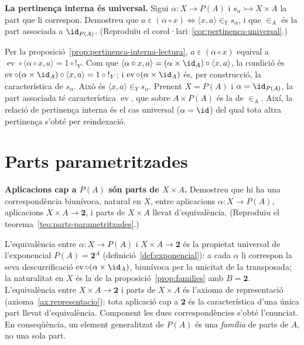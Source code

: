 \begin{exercici}
\textbf{La pertinença interna és universal.} Sigui \(\alpha\colon X\to P(A)\) i \(s_\alpha\rightarrowtail X\times A\) la part que li correspon. Demostreu que \(a\mathrel{\varepsilon}(\alpha\circ x)\iff\langle x,a\rangle\in_Y s_\alpha\), i que \(\in_A\) és la part associada a \(\id_{P(A)}\). (Reproduïu el corol·lari~\ref{cor:pertinenca-universal}.)
\end{exercici}
\begin{solucio}
Per la proposició~\ref{prop:pertinenca-interna-lectura}, \(a\mathrel{\varepsilon}(\alpha\circ x)\) equival a \(\operatorname{ev}\circ\langle\alpha\circ x,a\rangle=1\circ{!}_Y\). Com que \(\langle\alpha\circ x,a\rangle=(\alpha\times\id_A)\circ\langle x,a\rangle\), la condició és \(\operatorname{ev}\circ(\alpha\times\id_A)\circ\langle x,a\rangle=1\circ{!}_Y\); i \(\operatorname{ev}\circ(\alpha\times\id_A)\) és, per construcció, la característica de \(s_\alpha\). Això és \(\langle x,a\rangle\in_Y s_\alpha\). Prenent \(X=P(A)\) i \(\alpha=\id_{P(A)}\), la part associada té característica \(\operatorname{ev}\), que sobre \(A\times P(A)\) és la de \(\in_A\). Així, la relació de pertinença interna és el cas universal (\(\alpha=\id\)) del qual tota altra pertinença s'obté per reindexació.
\end{solucio}

\section{Parts parametritzades}\label{prac:parts-parametritzades}

\begin{exercici}
\textbf{Aplicacions cap a \(P(A)\) són parts de \(X\times A\).} Demostreu que hi ha una correspondència biunívoca, natural en \(X\), entre aplicacions \(\alpha\colon X\to P(A)\), aplicacions \(X\times A\to\mathbf2\), i parts de \(X\times A\) llevat d'equivalència. (Reproduïu el teorema~\ref{teo:parts-parametritzades}.)
\end{exercici}
\begin{solucio}
L'equivalència entre \(\alpha\colon X\to P(A)\) i \(X\times A\to\mathbf2\) és la propietat universal de l'exponencial \(P(A)=\mathbf2^{A}\) (definició~\ref{def:exponencial}): a cada \(\alpha\) li correspon la seva descurrificació \(\operatorname{ev}\circ(\alpha\times\id_A)\), biunívoca per la unicitat de la transposada; la naturalitat en \(X\) és la de la proposició~\ref{prop:families} amb \(B=\mathbf2\). L'equivalència entre \(X\times A\to\mathbf2\) i parts de \(X\times A\) és l'axioma de representació (axioma~\ref{ax:representacio}): tota aplicació cap a \(\mathbf2\) és la característica d'una única part llevat d'equivalència. Component les dues correspondències s'obté l'enunciat. En conseqüència, un element generalitzat de \(P(A)\) és una \emph{família} de parts de \(A\), no una sola part.
\end{solucio}

